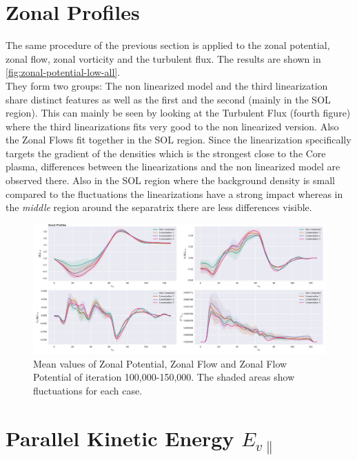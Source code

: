 \documentclass[master.tex]{subfiles}
\begin{document}
\section{Zonal Profiles}

The same procedure of the previous section is applied to the zonal potential, zonal flow, zonal vorticity and the turbulent flux. The results are shown in \autoref{fig:zonal-potential-low-all}.\\
They form two groups: The non linearized model and the third linearization share distinct features as well as the first and the second (mainly in the \ac{SOL} region). This can mainly be seen by looking at the Turbulent Flux (fourth figure) where the third linearizations fits very good to the non linearized version. Also the Zonal Flows fit together in the \ac{SOL} region. Since the linearization specifically targets the gradient of the densities which is the strongest close to the Core plasma, differences between the linearizations and the non linearized model are observed there. Also in the \ac{SOL} region where the background density is small compared to the fluctuations the linearizations have a strong impact whereas in the \textit{middle} region around the separatrix there are less differences visible.

\begin{figure}[!htbp]
    \includegraphics[width=\linewidth]{pdfs/0-2_0-64/zonal-profiles-100000.pdf}
    \caption{Mean values of Zonal Potential, Zonal Flow and Zonal Flow Potential of iteration 100,000-150,000. The shaded areas show fluctuations for each case.}
    \label{fig:zonal-potential-low-all}
\end{figure}

\section{Parallel Kinetic Energy $E_{v\parallel}$}\label{sec:polar_parallel_velocities}
\end{document}
